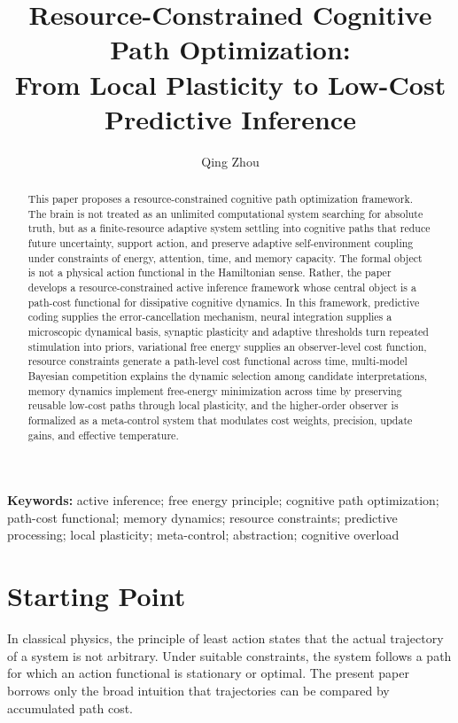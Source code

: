 \documentclass[11pt, a4paper]{article}
\title{\textbf{Resource-Constrained Cognitive Path Optimization: \\ From Local Plasticity to Low-Cost Predictive Inference}}
\author{Qing Zhou}
\date{}
\begin{document}
\maketitle

\begin{abstract}
\noindent This paper proposes a resource-constrained cognitive path optimization framework. The brain is not treated as an unlimited computational system searching for absolute truth, but as a finite-resource adaptive system settling into cognitive paths that reduce future uncertainty, support action, and preserve adaptive self-environment coupling under constraints of energy, attention, time, and memory capacity. The formal object is not a physical action functional in the Hamiltonian sense. Rather, the paper develops a resource-constrained active inference framework whose central object is a path-cost functional for dissipative cognitive dynamics. In this framework, predictive coding supplies the error-cancellation mechanism, neural integration supplies a microscopic dynamical basis, synaptic plasticity and adaptive thresholds turn repeated stimulation into priors, variational free energy supplies an observer-level cost function, resource constraints generate a path-level cost functional across time, multi-model Bayesian competition explains the dynamic selection among candidate interpretations, memory dynamics implement free-energy minimization across time by preserving reusable low-cost paths through local plasticity, and the higher-order observer is formalized as a meta-control system that modulates cost weights, precision, update gains, and effective temperature.
\end{abstract}

\textbf{Keywords:} active inference; free energy principle; cognitive path optimization; path-cost functional; memory dynamics; resource constraints; predictive processing; local plasticity; meta-control; abstraction; cognitive overload

\section{Starting Point}

In classical physics, the principle of least action states that the actual trajectory of a system is not arbitrary. Under suitable constraints, the system follows a path for which an action functional is stationary or optimal. The present paper borrows only the broad intuition that trajectories can be compared by accumulated path cost.
\end{document}
